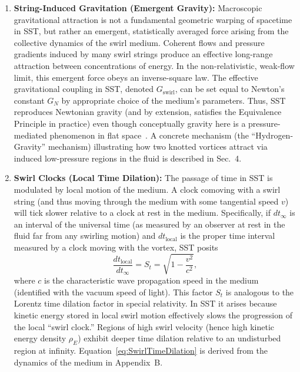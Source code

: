 \documentclass[10pt,reprint,aps,onecolumn,nofootinbib]{revtex4-2}
\newcommand{\rhoE}{\rho_{\!E}}                           %
\begin{document}
\begin{enumerate}
    \item \textbf{String-Induced Gravitation (Emergent Gravity):} Macroscopic gravitational attraction is not a fundamental geometric warping of spacetime in SST, but rather an emergent, statistically averaged force arising from the collective dynamics of the swirl medium. Coherent flows and pressure gradients induced by many swirl strings produce an effective long-range attraction between concentrations of energy. In the non-relativistic, weak-flow limit, this emergent force obeys an inverse-square law. The effective gravitational coupling in SST, denoted $G_{\text{swirl}}$, can be set equal to Newton’s constant $G_N$ by appropriate choice of the medium’s parameters. Thus, SST reproduces Newtonian gravity (and by extension, satisfies the Equivalence Principle in practice) even though conceptually gravity here is a pressure-mediated phenomenon in flat space~\cite{Jacobson1995, Verlinde2011}. A concrete mechanism (the ``Hydrogen-Gravity'' mechanism) illustrating how two knotted vortices attract via induced low-pressure regions in the fluid is described in Sec.~4.

    \item \textbf{Swirl Clocks (Local Time Dilation):} The passage of time in SST is modulated by local motion of the medium. A clock comoving with a swirl string (and thus moving through the medium with some tangential speed $v$) will tick slower relative to a clock at rest in the medium. Specifically, if $dt_{\infty}$ is an interval of the universal time (as measured by an observer at rest in the fluid far from any swirling motion) and $dt_{\text{local}}$ is the proper time interval measured by a clock moving with the vortex, SST posits
\begin{equation}
        \frac{dt_{\text{local}}}{dt_{\infty}} = S_t = \sqrt{1 - \frac{v^2}{c^2}},
    \label{eq:SwirlTimeDilation}
\end{equation}
    where $c$ is the characteristic wave propagation speed in the medium (identified with the vacuum speed of light). This factor $S_t$ is analogous to the Lorentz time dilation factor in special relativity. In SST it arises because kinetic energy stored in local swirl motion effectively slows the progression of the local ``swirl clock.'' Regions of high swirl velocity (hence high kinetic energy density $\rhoE$) exhibit deeper time dilation relative to an undisturbed region at infinity. Equation~\eqref{eq:SwirlTimeDilation} is derived from the dynamics of the medium in Appendix~B.


\end{enumerate}
\end{document}
